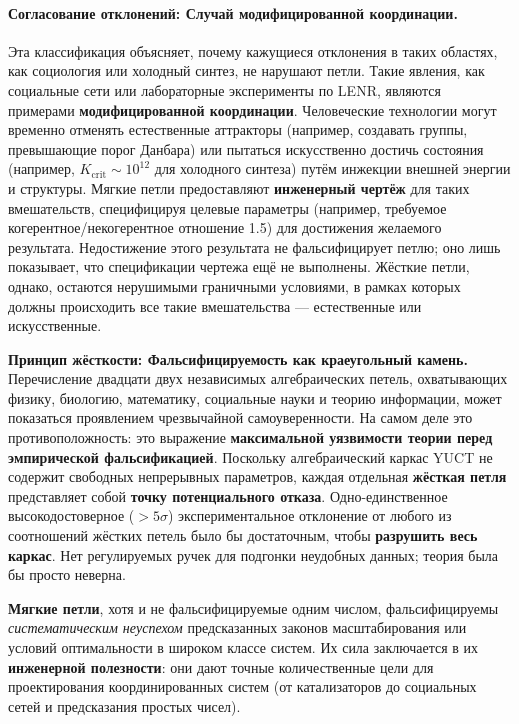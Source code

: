 \documentclass[12pt,a4paper]{article}
\begin{document}
	\paragraph{Согласование отклонений: Случай модифицированной координации.}
	Эта классификация объясняет, почему кажущиеся отклонения в таких областях, как социология или холодный синтез, не нарушают петли. Такие явления, как социальные сети или лабораторные эксперименты по LENR, являются примерами \textbf{модифицированной координации}. Человеческие технологии могут временно отменять естественные аттракторы (например, создавать группы, превышающие порог Данбара) или пытаться искусственно достичь состояния (например, \(K_{\mathrm{crit}} \sim 10^{12}\) для холодного синтеза) путём инжекции внешней энергии и структуры. Мягкие петли предоставляют \textbf{инженерный чертёж} для таких вмешательств, специфицируя целевые параметры (например, требуемое когерентное/некогерентное отношение 1.5) для достижения желаемого результата. Недостижение этого результата не фальсифицирует петлю; оно лишь показывает, что спецификации чертежа ещё не выполнены. Жёсткие петли, однако, остаются нерушимыми граничными условиями, в рамках которых должны происходить все такие вмешательства — естественные или искусственные.
	
	\vspace{0.5cm}
	\noindent
	\textbf{Принцип жёсткости: Фальсифицируемость как краеугольный камень.}
	Перечисление двадцати двух независимых алгебраических петель, охватывающих физику, биологию, математику, социальные науки и теорию информации, может показаться проявлением чрезвычайной самоуверенности. На самом деле это противоположность: это выражение \textbf{максимальной уязвимости теории перед эмпирической фальсификацией}. Поскольку алгебраический каркас YUCT не содержит свободных непрерывных параметров, каждая отдельная \textbf{жёсткая петля} представляет собой \textbf{точку потенциального отказа}. Одно-единственное высокодостоверное (\(>5\sigma\)) экспериментальное отклонение от любого из соотношений жёстких петель было бы достаточным, чтобы \textbf{разрушить весь каркас}. Нет регулируемых ручек для подгонки неудобных данных; теория была бы просто неверна.
	
	\textbf{Мягкие петли}, хотя и не фальсифицируемые одним числом, фальсифицируемы \textit{систематическим неуспехом} предсказанных законов масштабирования или условий оптимальности в широком классе систем. Их сила заключается в их \textbf{инженерной полезности}: они дают точные количественные цели для проектирования координированных систем (от катализаторов до социальных сетей и предсказания простых чисел).
	
\end{document}
